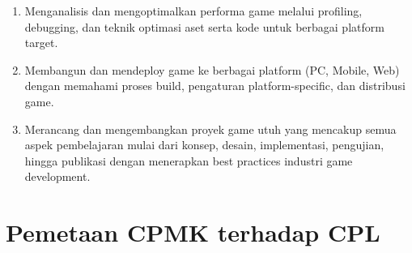 \documentclass[a4paper,12pt]{article}
\begin{document}
\begin{enumerate}[label=CPMK\arabic*:]
\item Menganalisis dan mengoptimalkan performa game melalui profiling, debugging, dan teknik optimasi aset serta kode untuk berbagai platform target.

\item Membangun dan mendeploy game ke berbagai platform (PC, Mobile, Web) dengan memahami proses build, pengaturan platform-specific, dan distribusi game.

\item Merancang dan mengembangkan proyek game utuh yang mencakup semua aspek pembelajaran mulai dari konsep, desain, implementasi, pengujian, hingga publikasi dengan menerapkan best practices industri game development.
\end{enumerate}

\section{Pemetaan CPMK terhadap CPL}
\end{document}
